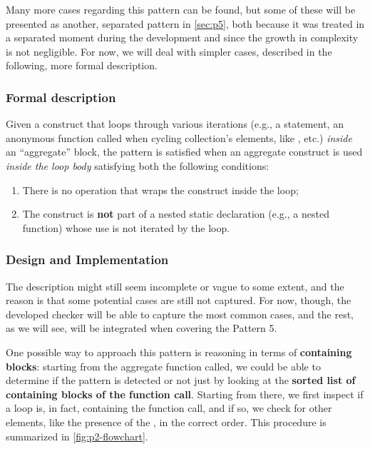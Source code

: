 \documentclass[12pt,a4paper,openright,twoside]{book}
\begin{document}
Many more cases regarding this pattern can be found, but some of these will be
presented as another, separated pattern in \cref{sec:p5}, both because it was 
treated in a separated moment during the development and since the growth in
complexity is not negligible. For now, we will deal with simpler cases,
described in the following, more formal description.

\subsubsection{Formal description}

Given a construct that loops through various iterations (e.g., a 
statement, an anonymous function called when cycling collection's elements, like
,  etc.) \emph{inside} an ``aggregate'' block, the
pattern is satisfied when an aggregate construct is used \emph{inside the loop
body} satisfying both the following conditions:
\begin{enumerate}
  \item There is no  operation that wraps the construct inside
  the loop;
  \item The construct is \textbf{not} part of a nested static declaration (e.g.,
  a nested function) whose use is not iterated by the loop.
\end{enumerate}

\subsubsection{Design and Implementation}

The description might still seem incomplete or vague to some extent, and the
reason is that some potential cases are still not captured. For now, though, the
developed checker will be able to capture the most common cases, and the rest,
as we will see, will be integrated when covering the Pattern 5. 

One possible way to approach this pattern is reasoning in terms of
\textbf{containing blocks}: starting from the aggregate function called, we
could be able to determine if the pattern is detected or not just by looking at
the \textbf{sorted list of containing blocks of the function call}. Starting
from there, we first inspect if a loop is, in fact, containing the function
call, and if so, we check for other elements, like the presence of the
, in the correct order. This procedure is summarized in
\cref{fig:p2-flowchart}.
\end{document}
